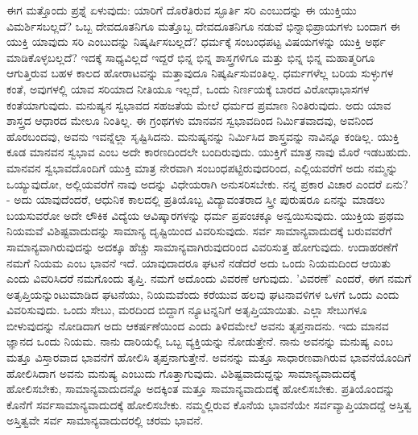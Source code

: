 ಈಗ ಮತ್ತೊಂದು ಪ್ರಶ್ನೆ ಏಳುವುದು: ಯಾರಿಗೆ ದೊರೆತಿರುವ ಸ್ಫೂರ್ತಿ ಸರಿ ಎಂಬುದನ್ನು ಈ ಯುಕ್ತಿಯು ವಿಮರ್ಶಿಸಬಲ್ಲದೆ? ಒಬ್ಬ ದೇವದೂತನಿಗೂ ಮತ್ತೊಬ್ಬ ದೇವದೂತನಿಗೂ ನಡುವೆ ಭಿನ್ನಾಭಿಪ್ರಾಯಗಳು ಬಂದಾಗ ಈ ಯುಕ್ತಿ ಯಾವುದು ಸರಿ ಎಂಬುದನ್ನು ನಿಷ್ಕರ್ಷಿಸಬಲ್ಲದೆ? ಧರ್ಮಕ್ಕೆ ಸಂಬಂಧಪಟ್ಟ ವಿಷಯಗಳನ್ನು ಯುಕ್ತಿ ಅರ್ಥ ಮಾಡಿಕೊಳ್ಳಬಲ್ಲದೆ? ಇದಕ್ಕೆ ಸಾಧ್ಯವಿಲ್ಲದೆ ಇದ್ದರೆ ಭಿನ್ನ ಭಿನ್ನ ಶಾಸ್ತ್ರಗಳಿಗೂ ಮತ್ತು ಭಿನ್ನ ಭಿನ್ನ ಮಹಾತ್ಮರಿಗೂ ಆಗುತ್ತಿರುವ ಬಹಳ ಕಾಲದ ಹೋರಾಟವನ್ನು ಮತ್ತಾವುದೂ ನಿಷ್ಕರ್ಷಿಸುವಂತಿಲ್ಲ. ಧರ್ಮಗಳೆಲ್ಲ ಬರಿಯ ಸುಳ್ಳುಗಳ ಕಂತೆ, ಅವುಗಳಲ್ಲಿ ಯಾವ ಸರಿಯಾದ ನೀತಿಯೂ ಇಲ್ಲದೆ, ಒಂದು ನಿರ್ಣಯಕ್ಕೆ ಬಾರದ ವಿರೋಧಾಭಾಸಗಳ ಕಂತೆಯಾಗುವುದು. ಮನುಷ್ಯನ ಸ್ವಭಾವದ ಸಹಜತೆಯ ಮೇಲೆ ಧರ್ಮದ ಪ್ರಮಾಣ ನಿಂತಿರುವುದು. ಅದು ಯಾವ ಶಾಸ್ತ್ರದ ಆಧಾರದ ಮೇಲೂ ನಿಂತಿಲ್ಲ. ಈ ಗ್ರಂಥಗಳು ಮಾನವನ ಸ್ವಭಾವದಿಂದ ನಿರ್ಮಿತವಾದವು, ಅವನಿಂದ ಹೊರಬಂದವು, ಅವನು ಇವನ್ನೆಲ್ಲಾ ಸೃಷ್ಟಿಸಿದನು. ಮನುಷ್ಯನನ್ನು ನಿರ್ಮಿಸಿದ ಶಾಸ್ತ್ರವನ್ನು ನಾವಿನ್ನೂ ಕಂಡಿಲ್ಲ. ಯುಕ್ತಿ ಕೂಡ ಮಾನವನ ಸ್ವಭಾವ ಎಂಬ ಅದೇ ಕಾರಣದಿಂದಲೇ ಬಂದಿರುವುದು. ಯುಕ್ತಿಗೆ ಮಾತ್ರ ನಾವು ಮೊರೆ ಇಡಬಹುದು. ಮಾನವನ ಸ್ವಭಾವದೊಂದಿಗೆ ಯುಕ್ತಿ ಮಾತ್ರ ನೇರವಾಗಿ ಸಂಬಂಧಪಟ್ಟಿರುವುದರಿಂದ, ಎಲ್ಲಿಯವರೆಗೆ ಅದು ನಮ್ಮನ್ನು ಒಯ್ಯುವುದೋ, ಅಲ್ಲಿಯವರೆಗೆ ನಾವು ಅದನ್ನು ವಿಧೇಯರಾಗಿ ಅನುಸರಿಸಬೇಕು. ನನ್ನ ಪ್ರಕಾರ ವಿಚಾರ ಎಂದರೆ ಏನು? - ಅದು ಯಾವುದೆಂದರೆ, ಆಧುನಿಕ ಕಾಲದಲ್ಲಿ ಪ್ರತಿಯೊಬ್ಬ ವಿದ್ಯಾವಂತರಾದ ಸ್ತ್ರೀ ಪುರುಷರೂ ಏನನ್ನು ಮಾಡಲು ಬಯಸುವರೋ ಅದೇ ಲೌಕಿಕ ವಿದ್ಯೆಯ ಆವಿಷ್ಕಾರಗಳನ್ನು ಧರ್ಮ ಪ್ರಪಂಚಕ್ಕೂ ಅನ್ವಯಿಸುವುದು. ಯುಕ್ತಿಯ ಪ್ರಥಮ ನಿಯಮವೆ ವಿಶಿಷ್ಟವಾದುದನ್ನು  ಸಾಮಾನ್ಯ ದೃಷ್ಟಿಯಿಂದ  ವಿವರಿಸುವುದು. ಸರ್ವ ಸಾಮಾನ್ಯವಾದುದಕ್ಕೆ ಬರುವವರೆಗೆ ಸಾಮಾನ್ಯವಾಗಿರುವುದನ್ನು ಅದಕ್ಕೂ ಹೆಚ್ಚು ಸಾಮಾನ್ಯವಾಗಿರುವುದರಿಂದ ವಿವರಿಸುತ್ತ ಹೋಗುವುದು. ಉದಾಹರಣೆಗೆ ನಮಗೆ ನಿಯಮ ಎಂಬ ಭಾವನೆ ಇದೆ. ಯಾವುದಾದರೂ ಘಟನೆ ನಡೆದರೆ ಅದು ಒಂದು ನಿಯಮದಿಂದ ಆಯಿತು ಎಂದು ವಿವರಿಸಿದರೆ ನಮಗೊಂದು ತೃಪ್ತಿ. ನಮಗೆ ಅದೊಂದು ವಿವರಣೆ ಆಗುವುದು. 'ವಿವರಣೆ' ಎಂದರೆ, ಈಗ ನಮಗೆ ಅತೃಪ್ತಿಯನ್ನುಂಟುಮಾಡಿದ ಘಟನೆಯು, ನಿಯಮವೆಂದು ಕರೆಯುವ ಹಲವು ಘಟನಾವಳಿಗಳ ಒಳಗೆ ಒಂದು ಎಂದು ವಿವರಿಸುವುದು. ಒಂದು ಸೇಬು, ಮರದಿಂದ ಬಿದ್ದಾಗ ನ್ಯೂಟನ್ನನಿಗೆ ಅತೃಪ್ತಿಯಾಯಿತು. ಎಲ್ಲಾ ಸೇಬುಗಳೂ ಬೀಳುವುದನ್ನು ನೋಡಿದಾಗ ಅದು ಆಕರ್ಷಣೆಯಿಂದ ಎಂದು ತಿಳಿದಮೇಲೆ ಅವನು ತೃಪ್ತನಾದನು. ಇದು ಮಾನವ ಜ್ಞಾನದ ಒಂದು ನಿಯಮ. ನಾನು ದಾರಿಯಲ್ಲಿ ಒಬ್ಬ ವ್ಯಕ್ತಿಯನ್ನು ನೋಡುತ್ತೇನೆ. ನಾನು ಅವನನ್ನು ಮನುಷ್ಯ ಎಂಬ ಮತ್ತೂ ವಿಸ್ತಾರವಾದ ಭಾವನೆಗೆ ಹೋಲಿಸಿ ತೃಪ್ತನಾಗುತ್ತೇನೆ. ಅವನನ್ನು ಮತ್ತೂ ಸಾಧಾರಣವಾಗಿರುವ ಭಾವನೆಯೊಂದಿಗೆ ಹೋಲಿಸಿದಾಗ ಅವನು ಮನುಷ್ಯ ಎಂಬುದು ಗೊತ್ತಾಗುವುದು. ವಿಶಿಷ್ಟವಾದುದ್ದನ್ನು ಸಾಮಾನ್ಯವಾದುದಕ್ಕೆ ಹೋಲಿಸಬೇಕು, ಸಾಮಾನ್ಯವಾದುದನ್ನೊ ಅದಕ್ಕಿಂತ ಮತ್ತೂ ಸಾಮಾನ್ಯವಾದುದಕ್ಕೆ ಹೋಲಿಸಬೇಕು. ಪ್ರತಿಯೊಂದನ್ನು ಕೊನೆಗೆ ಸರ್ವಸಾಮಾನ್ಯವಾದುದಕ್ಕೆ ಹೋಲಿಸಬೇಕು. ನಮ್ಮಲ್ಲಿರುವ ಕೊನೆಯ ಭಾವನೆಯೇ  ಸರ್ವವ್ಯಾಪ್ತಿಯಾದದ್ದೆ ಅಸ್ತಿತ್ವ  ಅಸ್ತಿತ್ವವೇ ಸರ್ವ ಸಾಮಾನ್ಯವಾದುದರಲ್ಲಿ ಚರಮ ಭಾವನೆ.

